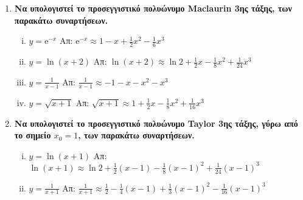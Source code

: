 


\everymath{\displaystyle}
\pagestyle{askhseis}



\begin{center}
  \minibox{\bfseries\large \textcolor{Col1}{Ασκήσεις στις Παραγώγους}}
\end{center}

\vspace{\baselineskip}


\begin{enumerate}
  \item {\bfseries Να υπολογιστεί το προσεγγιστικό πολυώνυμο Maclaurin 3ης τάξης, των 
    παρακάτω συναρτήσεων.}
    \begin{enumerate}[i)]
      \item $ y= \mathrm{e}^{-x} $ 
        \hfill Απ: $ \mathrm{e}^{-x} \approx 1-x+ \frac{1}{2} x^{2} - \frac{1}{6} x^{3} $ 
      \item $ y= \ln{(x+2)} $ 
        \hfill Απ: $ \ln{(x+2)} \approx \ln{2} + \frac{1}{2} x - \frac{1}{8} x^{2} +
        \frac{1}{24} x^{3} $ 
      \item $ y= \frac{1}{x-1} $ \hfill Απ: $ \frac{1}{x-1} \approx -1 -x -x^{2} - x^{3} $ 
      \item $ y= \sqrt{x+1} $ \hfill Απ: $ \sqrt{x+1} \approx 1 + \frac{1}{2} x -
        \frac{1}{8} x^{2} + \frac{1}{16} x^{3} $ 
    \end{enumerate}

  \item {\bfseries Να υπολογιστεί το προσεγγιστικό πολυώνυμο Taylor 3ης τάξης, γύρω από 
      το σημείο $ x_{0}=1 $, των παρακάτω συναρτήσεων.}
    \begin{enumerate}[i)]
      \item $ y= \ln{(x+1)} $ 
        \hfill Απ: $ \ln{(x+1)} \approx \ln{2} + \frac{1}{2} (x-1) - \frac{1}{8}
        (x-1)^{2} + \frac{1}{24} (x-1)^{3} $ 
      \item $ y= \frac{1}{x+1} $ \hfill Απ: $ \frac{1}{x+1} \approx \frac{1}{2} -
        \frac{1}{4} (x-1) + \frac{1}{3} (x-1)^{2} - \frac{1}{16} (x-1)^{3} $ 
    \end{enumerate}
\end{enumerate}











